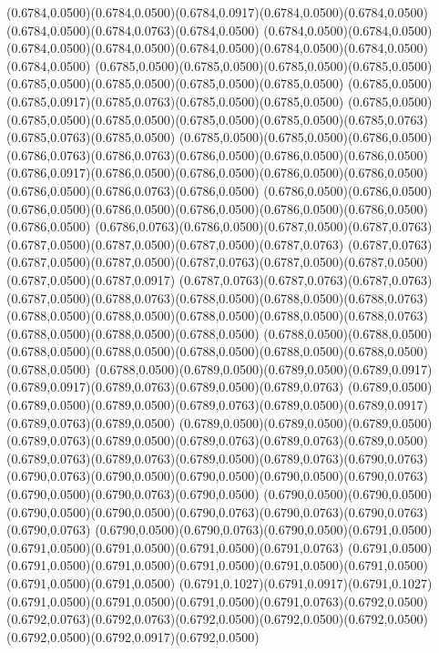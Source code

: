 (0.6784,0.0500)(0.6784,0.0500)(0.6784,0.0917)(0.6784,0.0500)(0.6784,0.0500)(0.6784,0.0500)(0.6784,0.0763)(0.6784,0.0500)
(0.6784,0.0500)(0.6784,0.0500)(0.6784,0.0500)(0.6784,0.0500)(0.6784,0.0500)(0.6784,0.0500)(0.6784,0.0500)(0.6784,0.0500)
(0.6785,0.0500)(0.6785,0.0500)(0.6785,0.0500)(0.6785,0.0500)(0.6785,0.0500)(0.6785,0.0500)(0.6785,0.0500)(0.6785,0.0500)
(0.6785,0.0500)(0.6785,0.0917)(0.6785,0.0763)(0.6785,0.0500)(0.6785,0.0500)
\PST@Solid(0.6785,0.0500)(0.6785,0.0500)(0.6785,0.0500)(0.6785,0.0500)(0.6785,0.0500)(0.6785,0.0763)(0.6785,0.0763)(0.6785,0.0500)
(0.6785,0.0500)(0.6785,0.0500)(0.6786,0.0500)(0.6786,0.0763)(0.6786,0.0763)(0.6786,0.0500)(0.6786,0.0500)(0.6786,0.0500)
(0.6786,0.0917)(0.6786,0.0500)(0.6786,0.0500)(0.6786,0.0500)(0.6786,0.0500)(0.6786,0.0500)(0.6786,0.0763)(0.6786,0.0500)
(0.6786,0.0500)(0.6786,0.0500)(0.6786,0.0500)(0.6786,0.0500)(0.6786,0.0500)(0.6786,0.0500)(0.6786,0.0500)(0.6786,0.0500)
(0.6786,0.0763)(0.6786,0.0500)(0.6787,0.0500)(0.6787,0.0763)(0.6787,0.0500)(0.6787,0.0500)(0.6787,0.0500)(0.6787,0.0763)
(0.6787,0.0763)(0.6787,0.0500)(0.6787,0.0500)(0.6787,0.0763)(0.6787,0.0500)(0.6787,0.0500)(0.6787,0.0500)(0.6787,0.0917)
(0.6787,0.0763)(0.6787,0.0763)(0.6787,0.0763)(0.6787,0.0500)(0.6788,0.0763)(0.6788,0.0500)(0.6788,0.0500)(0.6788,0.0763)
(0.6788,0.0500)(0.6788,0.0500)(0.6788,0.0500)(0.6788,0.0500)(0.6788,0.0763)(0.6788,0.0500)(0.6788,0.0500)(0.6788,0.0500)
(0.6788,0.0500)(0.6788,0.0500)(0.6788,0.0500)(0.6788,0.0500)(0.6788,0.0500)(0.6788,0.0500)(0.6788,0.0500)(0.6788,0.0500)
(0.6788,0.0500)(0.6789,0.0500)(0.6789,0.0500)(0.6789,0.0917)(0.6789,0.0917)(0.6789,0.0763)(0.6789,0.0500)(0.6789,0.0763)
(0.6789,0.0500)(0.6789,0.0500)(0.6789,0.0500)(0.6789,0.0763)(0.6789,0.0500)(0.6789,0.0917)(0.6789,0.0763)(0.6789,0.0500)
(0.6789,0.0500)(0.6789,0.0500)(0.6789,0.0500)(0.6789,0.0763)(0.6789,0.0500)(0.6789,0.0763)(0.6789,0.0763)(0.6789,0.0500)
(0.6789,0.0763)(0.6789,0.0763)(0.6789,0.0500)(0.6789,0.0763)(0.6790,0.0763)
\PST@Solid(0.6790,0.0763)(0.6790,0.0500)(0.6790,0.0500)(0.6790,0.0500)(0.6790,0.0763)(0.6790,0.0500)(0.6790,0.0763)(0.6790,0.0500)
(0.6790,0.0500)(0.6790,0.0500)(0.6790,0.0500)(0.6790,0.0500)(0.6790,0.0763)(0.6790,0.0763)(0.6790,0.0763)(0.6790,0.0763)
(0.6790,0.0500)(0.6790,0.0763)(0.6790,0.0500)(0.6791,0.0500)(0.6791,0.0500)(0.6791,0.0500)(0.6791,0.0500)(0.6791,0.0763)
(0.6791,0.0500)(0.6791,0.0500)(0.6791,0.0500)(0.6791,0.0500)(0.6791,0.0500)(0.6791,0.0500)(0.6791,0.0500)(0.6791,0.0500)
(0.6791,0.1027)(0.6791,0.0917)(0.6791,0.1027)(0.6791,0.0500)(0.6791,0.0500)(0.6791,0.0500)(0.6791,0.0763)(0.6792,0.0500)
(0.6792,0.0763)(0.6792,0.0763)(0.6792,0.0500)(0.6792,0.0500)(0.6792,0.0500)(0.6792,0.0500)(0.6792,0.0917)(0.6792,0.0500)
